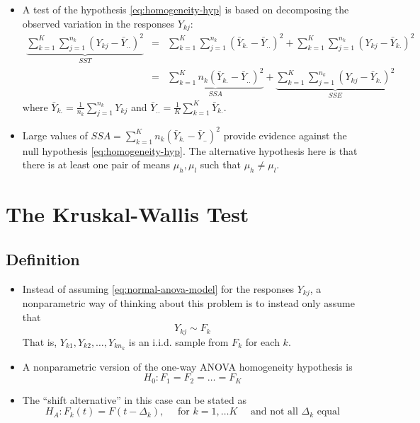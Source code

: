 \documentclass[]{book}
\begin{document}
\begin{itemize}
\item
  A test of the hypothesis \eqref{eq:homogeneity-hyp} is based on decomposing the observed variation in
  the responses \(Y_{kj}\):
  \begin{eqnarray}
  \underbrace{ \sum_{k=1}^{K}\sum_{j=1}^{n_{k}} (Y_{kj} - \bar{Y}_{..})^{2}}_{SST} &=& \sum_{k=1}^{K}\sum_{j=1}^{n_{k}} (\bar{Y}_{k.} - \bar{Y}_{..})^{2} + \sum_{k=1}^{K}\sum_{j=1}^{n_{k}} (Y_{kj} - \bar{Y}_{k.})^{2} \nonumber \\
  &=& \underbrace{\sum_{k=1}^{K} n_{k} (\bar{Y}_{k.} - \bar{Y}_{..})^{2}}_{SSA} + \underbrace{\sum_{k=1}^{K}\sum_{j=1}^{n_{k}} (Y_{kj} - \bar{Y}_{k.})^{2}}_{SSE} 
  \label{eq:anova-decomp}
  \end{eqnarray}
  where \(\bar{Y}_{k.} = \frac{1}{n_{k}}\sum_{j=1}^{n_{k}} Y_{kj}\) and \(\bar{Y}_{..} = \frac{1}{K}\sum_{k=1}^{K} \bar{Y}_{k.}\).
\item
  Large values of \(SSA = \sum_{k=1}^{K} n_{k} (\bar{Y}_{k.} - \bar{Y}_{..})^{2}\) provide evidence against the null hypothesis \eqref{eq:homogeneity-hyp}. The alternative hypothesis here is that there is at least one pair of means \(\mu_{h}, \mu_{l}\)
  such that \(\mu_{h} \neq \mu_{l}\).
\end{itemize}

\hypertarget{the-kruskal-wallis-test}{%
\section{The Kruskal-Wallis Test}\label{the-kruskal-wallis-test}}

\hypertarget{definition-2}{%
\subsection{Definition}\label{definition-2}}

\begin{itemize}
\item
  Instead of assuming \eqref{eq:normal-anova-model} for the responses \(Y_{kj}\), a nonparametric way of thinking
  about this problem is to instead only assume that
  \begin{equation}
  Y_{kj} \sim F_{k}
  \end{equation}
  That is, \(Y_{k1}, Y_{k2}, \ldots, Y_{kn_{k}}\) is an i.i.d. sample from \(F_{k}\) for each \(k\).
\item
  A nonparametric version of the one-way ANOVA homogeneity hypothesis is
  \begin{equation}
  H_{0}: F_{1} = F_{2} = \ldots = F_{K}
  \label{eq:nonpar-homogeneity-hyp}
  \end{equation}
\item
  The ``shift alternative'' in this case can be stated as
  \begin{equation}
  H_{A}: F_{k}(t) = F(t - \Delta_{k}), \quad \textrm{ for } k = 1, \ldots K \quad \textrm{ and not all $\Delta_{k}$ equal}
  \end{equation}
\end{itemize}
\end{document}
